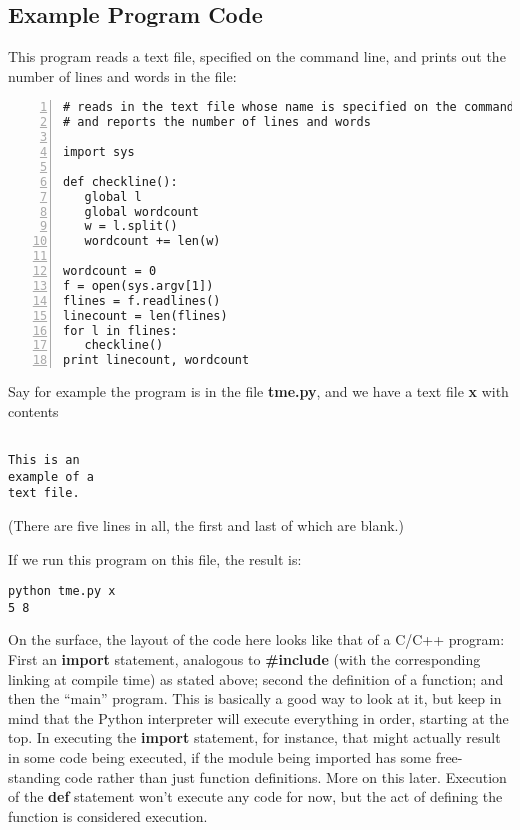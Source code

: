 \subsection{Example Program Code}
\label{tme}

This program reads a text file, specified on the command line, and
prints out the number of lines and words in the file:

\begin{Verbatim}[fontsize=\relsize{-2},numbers=left]
# reads in the text file whose name is specified on the command line,
# and reports the number of lines and words

import sys

def checkline():
   global l
   global wordcount
   w = l.split()
   wordcount += len(w)

wordcount = 0
f = open(sys.argv[1])
flines = f.readlines()
linecount = len(flines)  
for l in flines:
   checkline()
print linecount, wordcount
\end{Verbatim}

Say for example the program is in the file {\bf tme.py}, and we have a
text file {\bf x} with contents

\begin{Verbatim}[fontsize=\relsize{-2}]

This is an
example of a 
text file.

\end{Verbatim}

(There are five lines in all, the first and last of which are blank.)

If we run this program on this file, the result is:

\begin{Verbatim}[fontsize=\relsize{-2}]
python tme.py x
5 8
\end{Verbatim}

On the surface, the layout of the code here looks like that of a C/C++
program:  First an {\bf import} statement, analogous to {\bf \#include}
(with the corresponding linking at compile time) as stated above; second
the definition of a function; and then the ``main'' program.  This is
basically a good way to look at it, but keep in mind that the Python
interpreter will execute everything in order, starting at the top.  In
executing the {\bf import} statement, for instance, that might actually
result in some code being executed, if the module being imported has
some free-standing code rather than just function definitions.  More on
this later.  Execution of the {\bf def} statement won't execute any code
for now, but the act of defining the function is considered execution.

